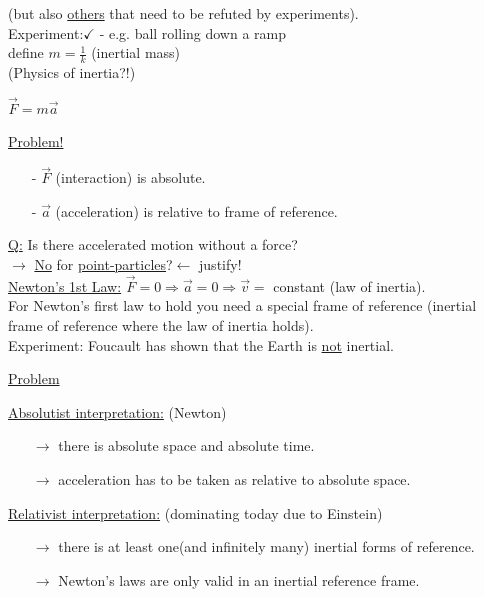 \documentclass[a4paper, 12pt]{article}
\begin{document}
\begin{enumerate}
\begin{itemize}
(but also \underline{others} that need to be refuted by experiments).\\
Experiment:$\checkmark$ - e.g. ball rolling down a ramp\\
define $m = \frac{1}{k}$ (inertial mass)\\
(Physics of inertia?!)
\begin{center}
$\vec{F} = m\vec{a}$
\end{center}
\underline{Problem!} \begin{itemize}
\item [-] $\vec{F}$ (interaction) is absolute.
\item [-] $\vec{a}$ (acceleration) is relative to frame of reference.
\end{itemize}
\underline{Q:} Is there accelerated motion without a force?\\
$\rightarrow$ \underline{No} for \underline{point-particles}?$\leftarrow$ justify!\\
\underline{Newton's 1st Law:} $\vec{F} = 0 \Rightarrow \vec{a} = 0 \Rightarrow \vec{v} = $ constant (law of inertia).\\
For Newton's first law to hold you need a special frame of reference (inertial frame of reference where the law of inertia holds).\\
Experiment: Foucault has shown that the Earth is \underline{not} inertial.\\
\newpage
\begin{center}
\underline{Problem}
\begin{multicols}{2}
\underline{Absolutist interpretation:}
(Newton)
\begin{itemize}
\item [$\rightarrow$] there is absolute space and absolute time.
\item [$\rightarrow$] acceleration has to be taken as relative to absolute space.
\end{itemize}
\vfill\null
\columnbreak
\underline{Relativist interpretation:}
(dominating today due to Einstein)
\begin{itemize}
\item [$\rightarrow$] there is at least one(and infinitely many) inertial forms of reference.
\item [$\rightarrow$] Newton's laws are only valid in an inertial reference frame. 
\end{itemize}
\end{multicols}
\end{center}
\end{itemize}
\end{enumerate}
\end{document}
